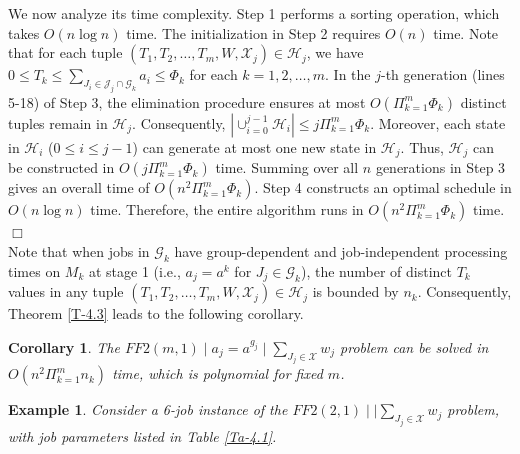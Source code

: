 \documentclass[12pt, eqno, limlimits]{article}
\newtheorem{cor}{Corollary}[section]
\newtheorem{exam}{Example}[section]
\begin{document}
\begin{sloppypar}
        We now analyze its time complexity. Step 1 performs a sorting operation, which takes $O(n\log n)$ time. The initialization in Step 2 requires $O(n)$ time. Note that for each tuple $(T_1, T_2, \ldots, T_m, W, \mathcal{X}_j) \in \mathcal{H}_j$, we have $0 \leq T_k \leq \sum_{J_i \in \mathcal{J}_j \cap \mathcal{G}_k} a_i \leq \Phi_k$ for each $k=1, 2, \ldots, m$. In the $j$-th generation (lines 5-18) of Step 3, the elimination procedure ensures at most $O(\Pi_{k=1}^m \Phi_k)$ distinct tuples remain in $\mathcal{H}_j$. Consequently, $|\cup_{i=0}^{j-1} \mathcal{H}_i| \leq j \Pi_{k=1}^m \Phi_k$. Moreover, each state in $\mathcal{H}_i$ ($0 \leq i \leq j-1$) can generate at most one new state in $\mathcal{H}_j$. Thus, $\mathcal{H}_j$ can be constructed in $O(j \Pi_{k=1}^m \Phi_k)$ time. Summing over all $n$ generations in Step 3 gives an overall time of $O(n^2 \Pi_{k=1}^m \Phi_k)$. Step 4 constructs an optimal schedule in $O(n \log n)$ time. Therefore, the entire algorithm runs in $O(n^2 \Pi_{k=1}^m \Phi_k)$ time. \hfill$\Box$\\
        
        Note that when jobs in $\mathcal{G}_k$ have group-dependent and job-independent processing times on $M_k$ at stage 1 (i.e., $a_j=a^k$ for $J_j \in \mathcal{G}_k$), the number of distinct $T_k$ values in any tuple $(T_1, T_2, \ldots, T_m, W, \mathcal{X}_j) \in \mathcal{H}_j$ is bounded by $n_k$. Consequently, Theorem \ref{T-4.3} leads to the following corollary. 
        
        \begin{cor} \label{C-4.1}
            The $FF2(m, 1)\mid a_j=a^{g_j} \mid \sum_{J_j \in \mathcal{X}} w_j$ problem can be solved in $O(n^2 \Pi_{k=1}^m n_k)$ time, which is polynomial for fixed $m$.
        \end{cor}
        
        \begin{exam} \label{Ex-4.1}
            Consider a 6-job instance of the $FF2(2, 1)\mid \mid \sum_{J_j \in \mathcal{X}} w_j$ problem, with job parameters listed in Table \ref{Ta-4.1}.
        \end{exam}
        

\end{sloppypar}
\end{document}
